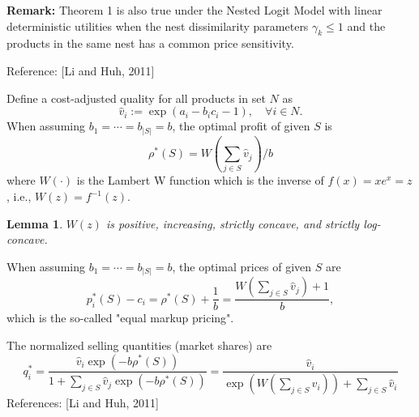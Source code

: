 \documentclass[11pt,a4paper]{article}
\newtheorem{lemma}{Lemma}
\begin{document}
\textbf{Remark:} Theorem 1 is also true under the Nested Logit Model with linear deterministic utilities when the nest dissimilarity parameters $\gamma_{k} \leq 1$ and the products in the same nest has a common price sensitivity.

Reference: [Li and Huh, 2011]

Define a cost-adjusted quality for all products in set $N$ as
$$
\hat{v}_{i}:=\exp \left(a_{i}-b_{i} c_{i}-1\right), \quad \forall i \in N .
$$
When assuming $b_{1}=\cdots=b_{|S|}=b$, the optimal profit of given $S$ is
$$
\rho^{*}(S)=W\left(\sum_{j \in S} \hat{v}_{j}\right) / b
$$
where $W(\cdot)$ is the Lambert W function which is the inverse of $f(x)=x e^{x}=z$, i.e., $W(z)=f^{-1}(z)$.
\begin{lemma}
    $W(z)$ is positive, increasing, strictly concave, and strictly log-concave.
\end{lemma}
When assuming $b_{1}=\cdots=b_{|S|}=b$, the optimal prices of given $S$ are
$$
p_{i}^{*}(S)-c_{i}=\rho^{*}(S)+\frac{1}{b}=\frac{W\left(\sum_{j \in S} \hat{v}_{j}\right)+1}{b},
$$
which is the so-called "equal markup pricing".

The normalized selling quantities (market shares) are
$$
q_{i}^{*}=\frac{\hat{v}_{i} \exp \left(-b \rho^{*}(S)\right)}{1+\sum_{j \in S} \hat{v}_{j} \exp \left(-b \rho^{*}(S)\right)}=\frac{\hat{v}_{i}}{\exp \left(W\left(\sum_{j \in S} \hat{v}_{i}\right)\right)+\sum_{j \in S} \hat{v}_{i}}
$$
References: [Li and Huh, 2011]
\end{document}
